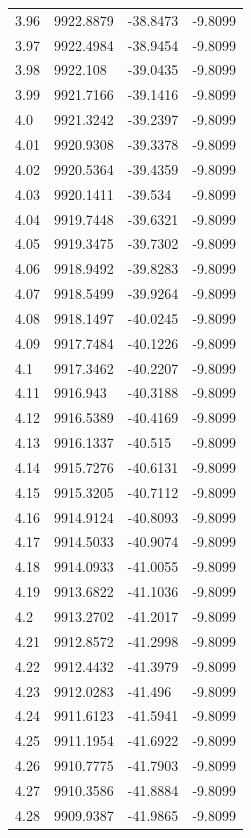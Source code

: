\begin{table}[H]
\begin{tabular}{llll}
3.96 & 9922.8879 & -38.8473 & -9.8099 \\
3.97 & 9922.4984 & -38.9454 & -9.8099 \\
3.98 & 9922.108 & -39.0435 & -9.8099 \\
3.99 & 9921.7166 & -39.1416 & -9.8099 \\
4.0 & 9921.3242 & -39.2397 & -9.8099 \\
4.01 & 9920.9308 & -39.3378 & -9.8099 \\
4.02 & 9920.5364 & -39.4359 & -9.8099 \\
4.03 & 9920.1411 & -39.534 & -9.8099 \\
4.04 & 9919.7448 & -39.6321 & -9.8099 \\
4.05 & 9919.3475 & -39.7302 & -9.8099 \\
4.06 & 9918.9492 & -39.8283 & -9.8099 \\
4.07 & 9918.5499 & -39.9264 & -9.8099 \\
4.08 & 9918.1497 & -40.0245 & -9.8099 \\
4.09 & 9917.7484 & -40.1226 & -9.8099 \\
4.1 & 9917.3462 & -40.2207 & -9.8099 \\
4.11 & 9916.943 & -40.3188 & -9.8099 \\
4.12 & 9916.5389 & -40.4169 & -9.8099 \\
4.13 & 9916.1337 & -40.515 & -9.8099 \\
4.14 & 9915.7276 & -40.6131 & -9.8099 \\
4.15 & 9915.3205 & -40.7112 & -9.8099 \\
4.16 & 9914.9124 & -40.8093 & -9.8099 \\
4.17 & 9914.5033 & -40.9074 & -9.8099 \\
4.18 & 9914.0933 & -41.0055 & -9.8099 \\
4.19 & 9913.6822 & -41.1036 & -9.8099 \\
4.2 & 9913.2702 & -41.2017 & -9.8099 \\
4.21 & 9912.8572 & -41.2998 & -9.8099 \\
4.22 & 9912.4432 & -41.3979 & -9.8099 \\
4.23 & 9912.0283 & -41.496 & -9.8099 \\
4.24 & 9911.6123 & -41.5941 & -9.8099 \\
4.25 & 9911.1954 & -41.6922 & -9.8099 \\
4.26 & 9910.7775 & -41.7903 & -9.8099 \\
4.27 & 9910.3586 & -41.8884 & -9.8099 \\
4.28 & 9909.9387 & -41.9865 & -9.8099 \\

\end{tabular}
\end{table}
